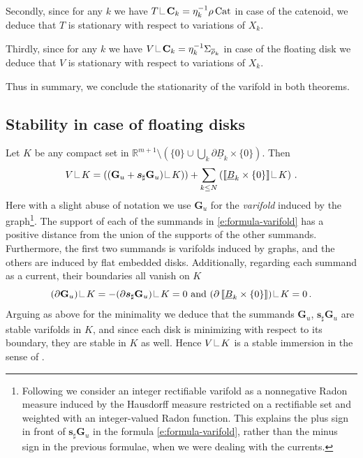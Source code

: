 \documentclass[reqno]{amsart}
\theoremstyle{definition}
\theoremstyle{remark}
\numberwithin{equation}{section}
\newcommand{\R}{\mathbb{R}}
\newcommand\res{\mathop{\hbox{\vrule height 7pt width .3pt depth 0pt\vrule height .3pt width 5pt depth 0pt}}\nolimits}
\newcommand{\bC}{\mathbf{C}} %
\newcommand{\bG}{\mathbf{G}} %
\def\a#1{\left\llbracket{#1}\right\rrbracket}
\begin{document}
Secondly, since for any $k$ we have $T\res \bC_k = {\eta_k^{-1}}\rho \operatorname{Cat}$ in case of the catenoid, we deduce that $T$ is  stationary with respect to variations of $X_k$.

Thirdly, since for any $k$ we have $V\res \bC_k = {\eta_k^{-1}}\Sigma_{\overline{\rho}_k}$ in case of the floating disk we deduce that $V$ is stationary with respect to variations of $X_k$. 

Thus in summary, we conclude the stationarity of the varifold in both theorems. 


\subsection{Stability in case of floating disks}\label{subsec.stability} 
Let $K$ be any compact set in $\R^{m+1}\setminus \left(\{0\} \cup \bigcup_k \partial \underline{B}_k \times \{0\} \right)$. Then 
\begin{equation}\label{e:formula-varifold}
 V \res K = \left( (\bG_u +\boldsymbol{s}_\sharp \bG_u )\res K) \right) +  \sum_{k \le N} \left(\a{\underline{B}_k\times \{0\} }\res K\right)\,.
\end{equation}
Here with a slight abuse of notation we use $\bG_u$ for the {\em varifold} induced by the graph\footnote{ Following \cite{Simon} we consider an integer rectifiable varifold as a nonnegative Radon measure induced by the Hausdorff measure restricted on a rectifiable set and weighted with an integer-valued Radon function. This explains the plus sign in front of $\boldsymbol{s}_\sharp \bG_u$ in the formula \eqref{e:formula-varifold}, rather than the minus sign in the previous formulae, when we were dealing with the currents.}.
The support of each of the summands in \eqref{e:formula-varifold} has a positive distance from the union of the supports of the other summands. Furthermore, the first two summands is varifolds induced by graphs, and the others are induced by flat embedded disks. 
Additionally, regarding each summand as a current, their boundaries all vanish on $K$ 
\[ (\partial \bG_u)\res K =-(\partial \boldsymbol{s}_\sharp\bG_u)\res K =0 \text{ and } (\partial \a{\underline{B}_k\times \{0\}}) \res K=0\,.\]
Arguing as above for the minimality we deduce that the summands $\bG_u$, $\boldsymbol{s}_\sharp\bG_u$ are stable varifolds in $K$, and since each disk is minimizing with respect to its boundary, they are stable in $K$ as well. Hence $V\res K$ is a stable immersion in the sense of \cite{Bellettini2025}.
\end{document}
